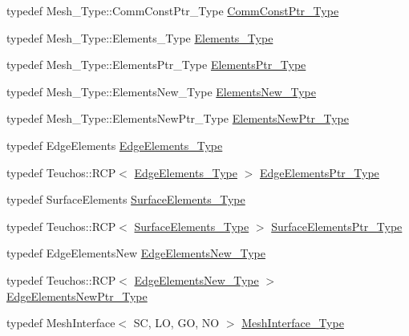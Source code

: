 \begin{DoxyCompactItemize}
typedef Mesh\+\_\+\+Type\+::\+Comm\+Const\+Ptr\+\_\+\+Type \hyperlink{classFEDD_1_1ErrorEstimation_a23c88f794d901561ef57840b68c0aa20}{Comm\+Const\+Ptr\+\_\+\+Type}
\item 
typedef Mesh\+\_\+\+Type\+::\+Elements\+\_\+\+Type \hyperlink{classFEDD_1_1ErrorEstimation_ac074c6f1011aead7c9b786ab33b23978}{Elements\+\_\+\+Type}
\item 
typedef Mesh\+\_\+\+Type\+::\+Elements\+Ptr\+\_\+\+Type \hyperlink{classFEDD_1_1ErrorEstimation_ae8e03ce6215a8a139c1c8e9d662030ce}{Elements\+Ptr\+\_\+\+Type}
\item 
typedef Mesh\+\_\+\+Type\+::\+Elements\+New\+\_\+\+Type \hyperlink{classFEDD_1_1ErrorEstimation_a4a9dbcc947775568cce988cb4a68a40b}{Elements\+New\+\_\+\+Type}
\item 
typedef Mesh\+\_\+\+Type\+::\+Elements\+New\+Ptr\+\_\+\+Type \hyperlink{classFEDD_1_1ErrorEstimation_a524b367a9af6f2c128a7a7ae27d74535}{Elements\+New\+Ptr\+\_\+\+Type}
\item 
typedef Edge\+Elements \hyperlink{classFEDD_1_1ErrorEstimation_a8014e1e4844351d77d667159034e7523}{Edge\+Elements\+\_\+\+Type}
\item 
typedef Teuchos\+::\+R\+CP$<$ \hyperlink{classFEDD_1_1ErrorEstimation_a8014e1e4844351d77d667159034e7523}{Edge\+Elements\+\_\+\+Type} $>$ \hyperlink{classFEDD_1_1ErrorEstimation_ac7ab89f64446e4c6e739058240497f04}{Edge\+Elements\+Ptr\+\_\+\+Type}
\item 
typedef Surface\+Elements \hyperlink{classFEDD_1_1ErrorEstimation_a0d0800ed536b01a9a4873d0b3508d97a}{Surface\+Elements\+\_\+\+Type}
\item 
typedef Teuchos\+::\+R\+CP$<$ \hyperlink{classFEDD_1_1ErrorEstimation_a0d0800ed536b01a9a4873d0b3508d97a}{Surface\+Elements\+\_\+\+Type} $>$ \hyperlink{classFEDD_1_1ErrorEstimation_a391a95553efe67657e031e1af4ec02cc}{Surface\+Elements\+Ptr\+\_\+\+Type}
\item 
typedef Edge\+Elements\+New \hyperlink{classFEDD_1_1ErrorEstimation_a6d88b3605199b28846c71278b7d34838}{Edge\+Elements\+New\+\_\+\+Type}
\item 
typedef Teuchos\+::\+R\+CP$<$ \hyperlink{classFEDD_1_1ErrorEstimation_a6d88b3605199b28846c71278b7d34838}{Edge\+Elements\+New\+\_\+\+Type} $>$ \hyperlink{classFEDD_1_1ErrorEstimation_ad3347e220a355c8edda97dd2805bf7ff}{Edge\+Elements\+New\+Ptr\+\_\+\+Type}
\item 
typedef Mesh\+Interface$<$ SC, LO, GO, NO $>$ \hyperlink{classFEDD_1_1ErrorEstimation_a11fff10f0a859ff6a2bef01b0ac73943}{Mesh\+Interface\+\_\+\+Type}

\end{DoxyCompactItemize}
